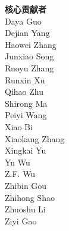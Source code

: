 \documentclass[11pt, a4paper, logo, copyright, nonumbering]{deepseek}
\begin{document}

\begin{multicols}{2}
\noindent
\textbf{\color{damaired} 核心贡献者} \\
\color{damaired} Daya Guo \\
\color{damaired} Dejian Yang \\
\color{damaired} Haowei Zhang \\
\color{damaired} Junxiao Song \\
\color{damaired} Ruoyu Zhang \\
\color{damaired} Runxin Xu \\
\color{damaired} Qihao Zhu \\
\color{damaired} Shirong Ma \\
\color{damaired} Peiyi Wang \\
\color{damaired} Xiao Bi \\
\color{damaired} Xiaokang Zhang \\
\color{damaired} Xingkai Yu \\
\color{damaired} Yu Wu \\
\color{damaired} Z.F. Wu \\
\color{damaired} Zhibin Gou \\
\color{damaired} Zhihong Shao \\
\color{damaired} Zhuoshu Li \\
\color{damaired} Ziyi Gao \\


\end{multicols}
\end{document}
